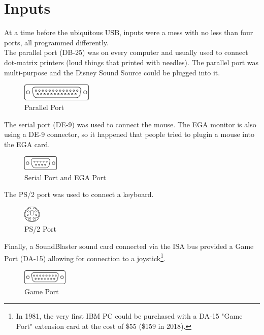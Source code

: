 \documentclass[book.tex]{subfiles}
\begin{document}
\section{Inputs}
At a time before the ubiquitous USB, inputs were a mess with no less than four ports, all programmed differently.\\

The parallel port (DB-25) was on every computer and usually used to connect dot-matrix printers (loud things that printed with needles). The parallel port was multi-purpose and the Disney Sound Source could be plugged into it.\\
\par
 \begin{figure}[H]
\centering
\includegraphics[width=0.3\textwidth]{imgs/drawings/ports/DB-25_parallel_port.eps}
\caption{Parallel Port}
\label{fig:parallelPort}
\end{figure}


The serial port (DE-9) was used to connect the mouse. The EGA monitor is also using a DE-9 connector, so it happened that people tried to plugin a mouse into the EGA card.
 \begin{figure}[H]
\centering
\includegraphics[width=0.15\textwidth]{imgs/drawings/ports/DE9_serial_port.eps}
\caption{Serial Port and EGA Port}
\label{fig:serialPort}
\end{figure}


The PS/2 port was used to connect a keyboard.
 \begin{figure}[H]
\centering
\includegraphics[width=0.07\textwidth]{imgs/drawings/ports/MiniDIN-6_PS2.eps}
\caption{PS/2 Port}
\label{fig:ps2Port}
\end{figure}


Finally, a SoundBlaster sound card connected via the ISA bus provided a Game Port (DA-15) allowing for connection to a joystick\footnote{In 1981, the very first IBM PC could be purchased with a DA-15 "Game Port" extension card at the cost of \$55 (\$159 in 2018).}.
 \begin{figure}[H]
\centering
\includegraphics[width=0.19\textwidth]{imgs/drawings/ports/DA-15_GamePort.eps}
\caption{Game Port}
\label{fig:gamePort}
\end{figure}
\end{document}
